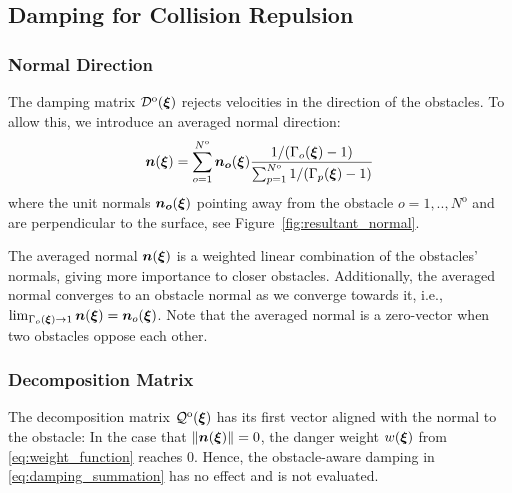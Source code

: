 \subsection{Damping for Collision Repulsion} \label{sec:obstacle_repulsion}

\subsubsection{Normal Direction}
The damping matrix $\mathcal{D}^{\mathrm{o}}(\boldsymbol{\xi})$ rejects velocities in the direction of the obstacles. To allow this, we introduce an averaged normal direction:
\begin{equation}
  \vecs n(\vecs\xi) = \sum_{o=1}^{N^{\mathrm{o}}} \vecs{n_o}(\vecs\xi)
  \frac{1 / (\Gamma_o(\vecs \xi) - 1)}{\sum_{p=1}^{N^\mathrm{o}} 1 / (\Gamma_p(\vecs \xi) - 1)}
  \label{eq:averaged_normal}
\end{equation}
 where the unit normals $\boldsymbol{n_o} (\boldsymbol{\xi})$ pointing away from the obstacle $o = 1,  ..,  N^{\mathrm{o}}$ and are perpendicular to the surface, see Figure~\ref{fig:resultant_normal}. 

The averaged normal $\boldsymbol{n}(\boldsymbol{\xi})$ is a weighted linear combination of the obstacles' normals, giving more importance to closer obstacles.
Additionally, the averaged normal converges to an obstacle normal as we converge towards it, i.e., $\lim_{\Gamma_o(\boldsymbol{\xi}) \rightarrow 1} \boldsymbol{n}(\boldsymbol{\xi}) = \boldsymbol{n}_o(\boldsymbol{\xi})$.
Note that the averaged normal is a zero-vector when two obstacles oppose each other. 

\subsubsection{Decomposition Matrix}
The decomposition matrix $\mathcal{Q}^{\mathrm{o}}(\boldsymbol{\xi})$ has its first vector aligned with the normal to the obstacle: 
In the case that $\lVert\boldsymbol{n}(\boldsymbol{\xi})\rVert = 0$, the danger weight $w(\boldsymbol{\xi})$ from \eqref{eq:weight_function} reaches 0. Hence, the obstacle-aware damping in \eqref{eq:damping_summation} has no effect and is not evaluated.

